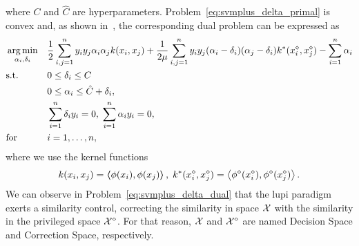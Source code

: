 where $C$ and $\hat{C}$ are hyperparameters.
Problem~\eqref{eq:svmplus_delta_primal} is convex and, as shown in~\cite{VapnikI15a}, the corresponding dual problem can be expressed as
\begin{equation}\label{eq:svmplus_delta_dual}
    \begin{aligned}
        & \argmin_{\alpha_i, \delta_i} 
        & & \frac{1}{2} \sum_{i, j=1}^\nsamples y_i y_j \alpha_i \alpha_j k(x_i, x_j) +\frac{1}{2 \mu} \sum_{i, j=1}^\nsamples y_i y_j (\alpha_i - \delta_i) (\alpha_j - \delta_i) k^*(\priv{x}_i, \priv{x}_j)  - \sum_{i=1}^\nsamples \alpha_i \\
        & \text{s.t.}
        & & 0 \leq \delta_i \leq C  \\
        & & & 0 \leq \alpha_i \leq \hat{C} + \delta_i, \\
        & & & \sum_{i=1}^{\nsamples}{\delta_i y_i} = 0, \; 
        \sum_{i=1}^{\nsamples}{\alpha_i y_i} = 0, \\
        & \text{for } & & i=1, \ldots, \nsamples,
        \end{aligned}
\end{equation}
where we use the kernel functions
$$k(x_i, x_j) = \bm{\left\langle} \phi(x_i), \phi(x_j) \bm{\right\rangle}, \; k^*({x}^{\diamond}_i, {x}^{\diamond}_j) = \bm{\left\langle} {\phi}^{\diamond}({x}^{\diamond}_i), {\phi}^{\diamond}({x}^{\diamond}_j) \bm{\right\rangle}.$$ 
We can observe in Problem~\eqref{eq:svmplus_delta_dual} that the \acrshort{lupi} paradigm exerts a similarity control, correcting the similarity in space $\mathcal{X}$ with the similarity in the privileged space ${\mathcal{X}}^{\diamond}$. For that reason, $\mathcal{X}$ and ${\mathcal{X}}^{\diamond}$ are named Decision Space and Correction Space, respectively.



